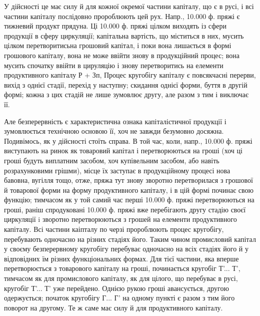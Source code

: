 У дійсності це має силу й для кожної окремої частини капіталу,
що є в русі, і всі частини капіталу послідовно пророблюють цей рух.
Напр., 10.000 ф. пряжі є тижневий продукт прядуна. Ці 10.000 ф.
пряжі цілком виходять із сфери продукції в сферу циркуляції; капітальна
вартість, що міститься в них, мусить цілком перетворитисьна грошовий капітал,
і поки вона лишається в формі грошового капіталу, вона не може ввійти
знову в продукційний процес; вона мусить спочатку ввійти в цируляцію
і знову перетворитись на елементи продуктивного капіталу Р + Зп, Процес
кругобігу капіталу є повсякчасні перерви, вихід з однієї стадії, перехід
у наступну; скидання однієї форми, буття в другій формі; кожна з цих
стадій не лише зумовлює другу, але разом з тим і виключає її.

Але безперервність є характеристична ознака капіталістичної продукції
і зумовлюється технічною основою її, хоч не завжди безумовно досяжна.
Подивімось, як у дійсності стоїть справа. В той час, коли, напр., 10.000 ф.
пряжі виступають на ринок як товаровий капітал і перетворюються на
гроші (хоч ці гроші будуть виплатним засобом, хоч купівельним
засобом, або навіть розрахунковими грішми), місце їх заступає в продукційному
процесі нова бавовна, вугілля тощо, отже, пряжа тут знову
зворотно перетворилася з грошової й товарової форми на форму продуктивного
капіталу, і в цій формі починає свою функцію; тимчасом як у
той самий час перші 10.000 ф. пряжі перетворюються на гроші, раніш спродуковані
10.000 ф. пряжі вже перебігають другу стадію своєї циркуляції
i зворотно перетворюються з грошей на елементи продуктивного капіталу.
Всі частини каіпталу по черзі пророблюють процес кругобігу, перебувають
одночасно на різних стадіях його. Таким чином промисловий капітал
у своєму безперервному кругобігу перебуває одночасно на всіх стадіях
його й у відповідних їм різних функціональних формах. Для тієї частини,
яка вперше перетворюється з товарового капіталу на гроші, починається
кругобіг Т'... Т', тимчасом як для промислового капіталу, як для цілого,
що перебуває в русі, кругобіг Т'... Т' уже перейдено. Однією рукою гроші
авансується, другою одержується; початок кругобігу Г... Г' на одному
пункті є разом з тим його поворот на другому. Те ж саме має силу
й для продуктивного капіталу.

